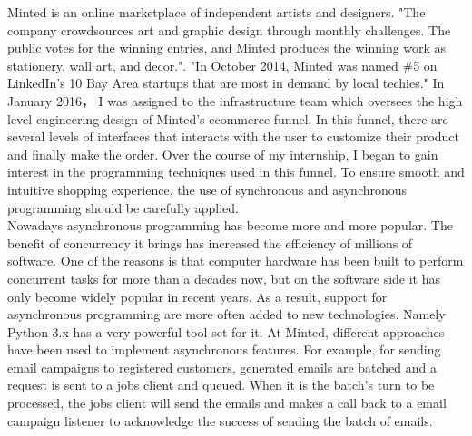\documentclass[12pt]{article}
\begin{document}
Minted is an online marketplace of independent artists and designers. "The company crowdsources art and graphic design through monthly challenges. The public votes for the winning entries, and Minted produces the winning work as stationery, wall art, and decor."\cite{telusComp}. "In October 2014, Minted was named \#5 on LinkedIn's 10 Bay Area startups that are most in demand by local techies."\cite{telusComp} In January 2016， I was assigned to the infrastructure team which oversees the high level engineering design of Minted's ecommerce funnel. In this funnel, there are several levels of interfaces that interacts with the user to customize their product and finally make the order. Over the course of my internship, I began to gain interest in the programming techniques used in this funnel. To ensure smooth and intuitive shopping experience, the use of synchronous and asynchronous programming should be carefully applied.\\

Nowadays asynchronous programming has become more and more popular. The benefit of concurrency it brings has increased the efficiency of millions of software. One of the reasons is that computer hardware has been built to perform concurrent tasks for more than a decades now, but on the software side it has only become widely popular in recent years. As a result, support for asynchronous programming are more often added to new technologies. Namely Python 3.x has a very powerful tool set for it. At Minted, different approaches have been used to implement asynchronous features. For example, for sending email campaigns to registered customers, generated emails are batched and a request is sent to a jobs client and queued. When it is the batch's turn to be processed, the jobs client will send the emails and makes a call back to a email campaign listener to acknowledge the success of sending the batch of emails.\\
\end{document}
